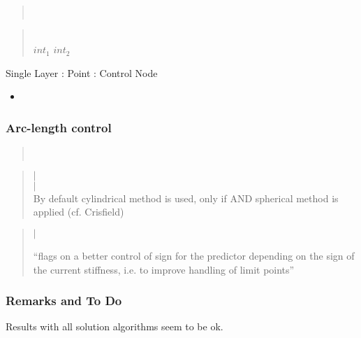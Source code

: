 \begin{quote}
 \\
\end{quote}

\begin{quote}
\\
 $int_1$  $int_2$
\end{quote}

 Single Layer : Point : Control Node

\begin{itemize}
\item {}
\end{itemize}
\subsubsection{Arc-length control}
\begin{quote}
 \\
\end{quote}

\begin{quote}
  $|$ \\ 
  $|$ \\
By default cylindrical method is used, only if  
AND   spherical method is applied (cf. Crisfield)\\
\end{quote}

\begin{quote}
  $|$ 

 ``flags on a better control of
sign for the predictor depending on the sign of the current stiffness,
i.e. to improve handling of limit points''
\end{quote}

\subsubsection{Remarks and To Do}

Results with all solution algorithms seem to be ok.

